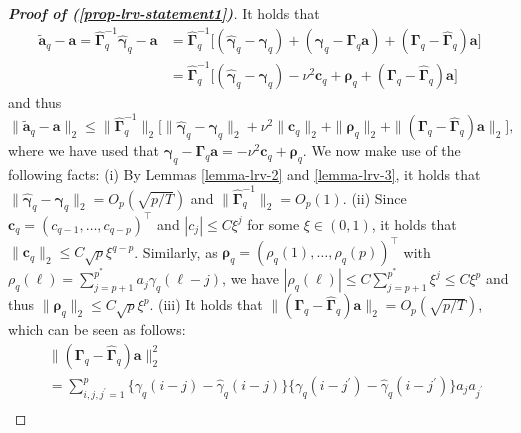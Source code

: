 \begin{proof}[\textnormal{\textbf{Proof of (\ref{prop-lrv-statement1})}}] It holds that   
\begin{align*}
\widetilde{\boldsymbol{a}}_q - \boldsymbol{a} = \widehat{\boldsymbol{\Gamma}}_q^{-1} \widehat{\boldsymbol{\gamma}}_q - \boldsymbol{a}   
 & = \widehat{\boldsymbol{\Gamma}}_q^{-1} \big[ (\widehat{\boldsymbol{\gamma}}_q - \boldsymbol{\gamma}_q) + (\boldsymbol{\gamma}_q - \boldsymbol{\Gamma}_q \boldsymbol{a}) + (\boldsymbol{\Gamma}_q - \widehat{\boldsymbol{\Gamma}}_q)\boldsymbol{a} \big] \\
 & = \widehat{\boldsymbol{\Gamma}}_q^{-1} \big[ (\widehat{\boldsymbol{\gamma}}_q - \boldsymbol{\gamma}_q) - \nu^2 \boldsymbol{c}_q + \boldsymbol{\rho}_q  + (\boldsymbol{\Gamma}_q - \widehat{\boldsymbol{\Gamma}}_q)\boldsymbol{a} \big] 
\end{align*}
and thus 
\begin{equation}\label{eq1-prop-lrv-statement1}
\| \widetilde{\boldsymbol{a}}_q - \boldsymbol{a} \|_2 \le \| \widehat{\boldsymbol{\Gamma}}_q^{-1} \|_2 \Big[ \| \widehat{\boldsymbol{\gamma}}_q - \boldsymbol{\gamma}_q \|_2 + \nu^2 \| \boldsymbol{c}_q \|_2 + \| \boldsymbol{\rho}_q \|_2 + \| (\boldsymbol{\Gamma}_q - \widehat{\boldsymbol{\Gamma}}_q) \boldsymbol{a} \|_2 \Big], 
\end{equation}
where we have used that $\boldsymbol{\gamma}_q - \boldsymbol{\Gamma}_q \boldsymbol{a} = -\nu^2 \boldsymbol{c}_q + \boldsymbol{\rho}_q$. We now make use of the following facts: (i) By Lemmas \ref{lemma-lrv-2} and \ref{lemma-lrv-3}, it holds that $\| \widehat{\boldsymbol{\gamma}}_q - \boldsymbol{\gamma}_q \|_2 = O_p(\sqrt{p/T})$ and $\| \widehat{\boldsymbol{\Gamma}}_q^{-1} \|_2 = O_p(1)$. (ii) Since $\boldsymbol{c}_q = (c_{q-1},\ldots,c_{q-p})^\top$ and $|c_j| \le C \xi^j$ for some $\xi \in (0,1)$, it holds that $\| \boldsymbol{c}_q \|_2 \le C \sqrt{p} \xi^{q-p}$. Similarly, as $\boldsymbol{\rho}_q = (\rho_q(1),\ldots,\rho_q(p))^\top$ with $\rho_q(\ell) = \sum_{j=p+1}^{p^*} a_j \gamma_q(\ell-j)$, we have $|\rho_q(\ell)| \le C \sum_{j=p+1}^{p^*} \xi^j \le C \xi^p$ and thus $\| \boldsymbol{\rho}_q \|_2 \le C \sqrt{p} \xi^p$. (iii) It holds that $\| (\boldsymbol{\Gamma}_q - \widehat{\boldsymbol{\Gamma}}_q) \boldsymbol{a} \|_2 = O_p(\sqrt{p/T})$, which can be seen as follows: 
\begin{align*}
 & \| (\boldsymbol{\Gamma}_q - \widehat{\boldsymbol{\Gamma}}_q) \boldsymbol{a} \|_2^2 \\
 & = \sum_{i,j,j^\prime=1}^p \big\{ \gamma_q(i-j) - \widehat{\gamma}_q(i-j) \big \} \big\{ \gamma_q(i-j^\prime) - \widehat{\gamma}_q(i-j^\prime) \big \} a_j a_{j^\prime} \\ 

\end{align*}
\end{proof}
